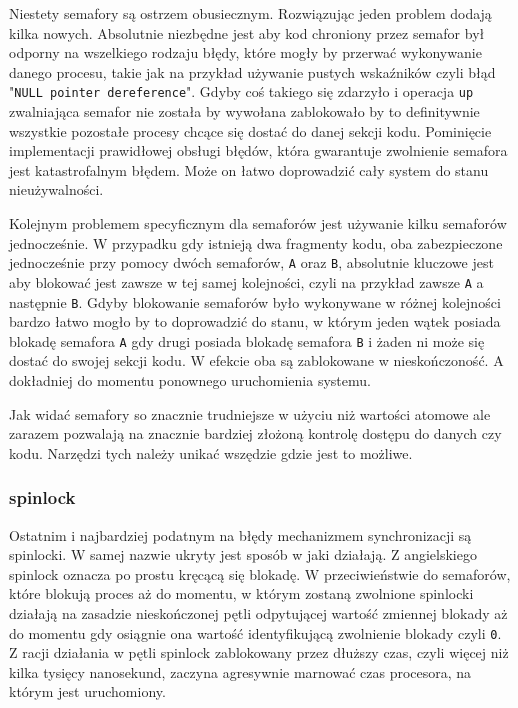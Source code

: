 \documentclass[10pt]{scrartcl}
\begin{document}
Niestety semafory są ostrzem obusiecznym. Rozwiązując jeden problem dodają kilka nowych. Absolutnie niezbędne jest aby kod chroniony przez semafor był odporny na wszelkiego rodzaju błędy, które mogły by przerwać wykonywanie danego procesu, takie jak na przykład używanie pustych wskaźników czyli błąd "\texttt{NULL pointer dereference}". Gdyby coś takiego się zdarzyło i operacja \texttt{up} zwalniająca semafor nie została by wywołana zablokowało by to definitywnie wszystkie pozostałe procesy chcące się dostać do danej sekcji kodu. Pominięcie implementacji prawidłowej obsługi błędów, która gwarantuje zwolnienie semafora jest katastrofalnym błędem. Może on łatwo doprowadzić cały system do stanu nieużywalności.

Kolejnym problemem specyficznym dla semaforów jest używanie kilku semaforów jednocześnie. W przypadku gdy istnieją dwa fragmenty kodu, oba zabezpieczone jednocześnie przy pomocy dwóch semaforów, \texttt{A} oraz \texttt{B}, absolutnie kluczowe jest aby blokować jest zawsze w tej samej kolejności, czyli na przykład zawsze \texttt{A} a następnie \texttt{B}. Gdyby blokowanie semaforów było wykonywane w różnej kolejności bardzo łatwo mogło by to doprowadzić do stanu, w którym jeden wątek posiada blokadę semafora \texttt{A} gdy drugi posiada blokadę semafora \texttt{B} i żaden ni może się dostać do swojej sekcji kodu. W efekcie oba są zablokowane w nieskończoność. A dokładniej do momentu ponownego uruchomienia systemu.

Jak widać semafory so znacznie trudniejsze w użyciu niż wartości atomowe ale zarazem pozwalają na znacznie bardziej złożoną kontrolę dostępu do danych czy kodu. Narzędzi tych należy unikać wszędzie gdzie jest to możliwe.

\subsubsection{spinlock}

Ostatnim i najbardziej podatnym na błędy mechanizmem synchronizacji są spinlocki. W samej nazwie ukryty jest sposób w jaki działają. Z angielskiego spinlock oznacza po prostu kręcącą się blokadę. W przeciwieństwie do semaforów, które blokują proces aż do momentu, w którym zostaną zwolnione spinlocki działają na zasadzie nieskończonej pętli odpytującej wartość zmiennej blokady aż do momentu gdy osiągnie ona wartość identyfikującą zwolnienie blokady czyli \texttt{0}. Z racji działania w pętli spinlock zablokowany przez dłuższy czas, czyli więcej niż kilka tysięcy nanosekund, zaczyna agresywnie marnować czas procesora, na którym jest uruchomiony.
\end{document}
